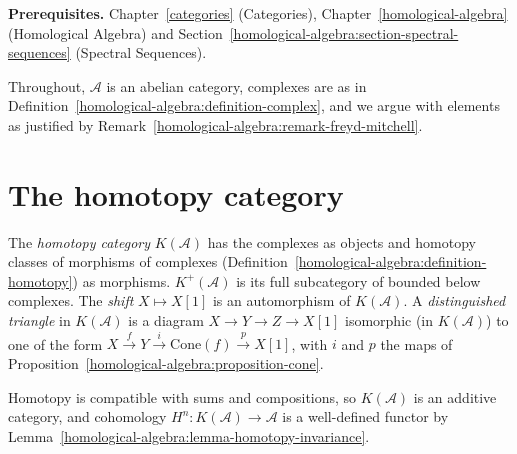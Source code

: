 \noindent\textbf{Prerequisites.} Chapter~\ref{categories} (Categories), Chapter~\ref{homological-algebra} (Homological
Algebra) and Section~\ref{homological-algebra:section-spectral-sequences} (Spectral Sequences).

Throughout, $\mathcal{A}$ is an abelian category, complexes are as in
Definition~\ref{homological-algebra:definition-complex}, and we argue with elements as justified by
Remark~\ref{homological-algebra:remark-freyd-mitchell}.

\section{The homotopy category}\label{homological-algebra:section-homotopy-category}

\begin{definition}\label{homological-algebra:definition-homotopy-category}
The \emph{homotopy category} $K(\mathcal{A})$ has the complexes as objects and homotopy classes of morphisms of complexes
(Definition~\ref{homological-algebra:definition-homotopy}) as morphisms. $K^+(\mathcal{A})$ is its full subcategory of bounded
below complexes. The \emph{shift} $X \mapsto X[1]$ is an automorphism of $K(\mathcal{A})$. A \emph{distinguished triangle} in
$K(\mathcal{A})$ is a diagram $X \to Y \to Z \to X[1]$ isomorphic (in $K(\mathcal{A})$) to one of the form
$X \xrightarrow{f} Y \xrightarrow{i} \mathrm{Cone}(f) \xrightarrow{p} X[1]$, with $i$ and $p$ the maps of
Proposition~\ref{homological-algebra:proposition-cone}.
\end{definition}

\begin{remark}\label{homological-algebra:remark-homotopy-well-defined}
Homotopy is compatible with sums and compositions, so $K(\mathcal{A})$ is an additive category, and cohomology
$H^n \colon K(\mathcal{A}) \to \mathcal{A}$ is a well-defined functor by Lemma~\ref{homological-algebra:lemma-homotopy-invariance}.
\end{remark}


